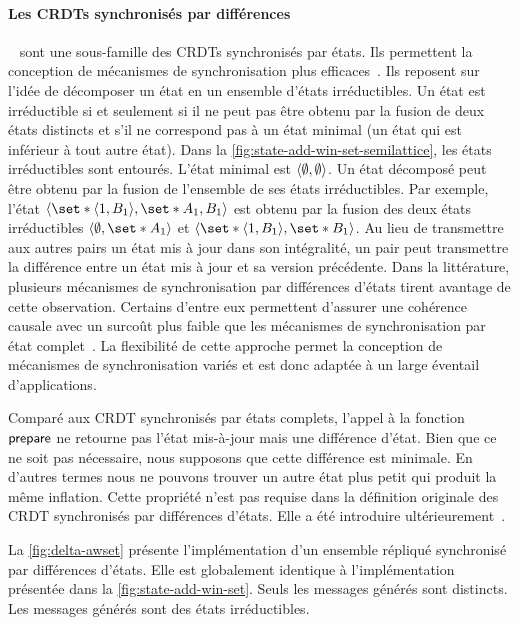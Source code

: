 \paragraph{Les \acp{CRDT} synchronisés par différences}~\autocite{almeida_2018_delta-crdt-revisited} sont une sous-famille des \acp{CRDT} synchronisés par états.
Ils permettent la conception de mécanismes de synchronisation plus efficaces~\autocite{enes_2018_efficient-sync-state-based-crdt}.
Ils reposent sur l'idée de décomposer un état en un ensemble d'états irréductibles.
Un état est irréductible si et seulement si il ne peut pas être obtenu par la fusion de deux états distincts et s'il ne correspond pas à un état minimal (un état qui est inférieur à tout autre état).
Dans la \autoref{fig:state-add-win-set-semilattice}, les états irréductibles sont entourés.
L'état minimal est $\tuple*{\emptyset, \emptyset}$.
Un état décomposé peut être obtenu par la fusion de l'ensemble de ses états irréductibles.
Par exemple, l'état $\tuple*{\set*{\tuple*{1,B_1}}, \set*{A_1,B_1}}$ est obtenu par la fusion des deux états irréductibles $\tuple*{\emptyset, \set*{A_1}}$ et $\tuple*{\set*{\tuple*{1,B_1}}, \set*{B_1}}$.
Au lieu de transmettre aux autres pairs un état mis à jour dans son intégralité, un pair peut transmettre la différence entre un état mis à jour et sa version précédente.
Dans la littérature, plusieurs mécanismes de synchronisation par différences d'états tirent avantage de cette observation.
Certains d'entre eux permettent d'assurer une cohérence causale avec un surcoût plus faible que les mécanismes de synchronisation par état complet~\autocite{enes_2018_efficient-sync-state-based-crdt}.
La flexibilité de cette approche permet la conception de mécanismes de synchronisation variés et est donc adaptée à un large éventail d'applications.

Comparé aux \ac{CRDT} synchronisés par états complets, l'appel à la fonction $\trm{prepare}$ ne retourne pas l'état mis-à-jour mais une différence d'état.
Bien que ce ne soit pas nécessaire, nous supposons que cette différence est minimale.
En d'autres termes nous ne pouvons trouver un autre état plus petit qui produit la même inflation.
Cette propriété n'est pas requise dans la définition originale des \ac{CRDT} synchronisés par différences d'états.
Elle a été introduire ultérieurement~\autocite{enes_2018_efficient-sync-state-based-crdt}.

La \autoref{fig:delta-awset} présente l'implémentation d'un ensemble répliqué synchronisé par différences d'états.
Elle est globalement identique à l'implémentation présentée dans la \autoref{fig:state-add-win-set}.
Seuls les messages générés sont distincts.
Les messages générés sont des états irréductibles.

